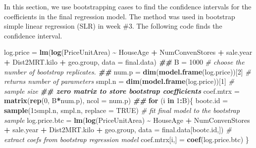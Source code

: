 \documentclass[
]{book}
\newenvironment{Shaded}{\begin{snugshade}}{\end{snugshade}}
\newcommand{\AttributeTok}[1]{\textcolor[rgb]{0.13,0.29,0.53}{#1}}
\newcommand{\CommentTok}[1]{\textcolor[rgb]{0.56,0.35,0.01}{\textit{#1}}}
\newcommand{\ConstantTok}[1]{\textcolor[rgb]{0.56,0.35,0.01}{#1}}
\newcommand{\ControlFlowTok}[1]{\textcolor[rgb]{0.13,0.29,0.53}{\textbf{#1}}}
\newcommand{\DecValTok}[1]{\textcolor[rgb]{0.00,0.00,0.81}{#1}}
\newcommand{\DocumentationTok}[1]{\textcolor[rgb]{0.56,0.35,0.01}{\textbf{\textit{#1}}}}
\newcommand{\FunctionTok}[1]{\textcolor[rgb]{0.13,0.29,0.53}{\textbf{#1}}}
\newcommand{\NormalTok}[1]{#1}
\newcommand{\OtherTok}[1]{\textcolor[rgb]{0.56,0.35,0.01}{#1}}
\newcommand{\SpecialCharTok}[1]{\textcolor[rgb]{0.81,0.36,0.00}{\textbf{#1}}}
\begin{document}
In this section, we use bootstrapping cases to find the confidence intervals for the coefficients in the final regression model. The method was used in bootstrap simple linear regression (SLR) in week \#3. The following code finds the confidence interval.

\begin{Shaded}
\begin{Highlighting}[]
\NormalTok{log.price }\OtherTok{=} \FunctionTok{lm}\NormalTok{(}\FunctionTok{log}\NormalTok{(PriceUnitArea) }\SpecialCharTok{\textasciitilde{}}\NormalTok{ HouseAge }\SpecialCharTok{+}\NormalTok{ NumConvenStores }\SpecialCharTok{+}\NormalTok{ sale.year }\SpecialCharTok{+}  
\NormalTok{                 Dist2MRT.kilo  }\SpecialCharTok{+}\NormalTok{ geo.group, }\AttributeTok{data =}\NormalTok{ final.data)}
\DocumentationTok{\#\#}
\NormalTok{B }\OtherTok{=} \DecValTok{1000}    \CommentTok{\# choose the number of bootstrap replicates.}
\DocumentationTok{\#\# }
\NormalTok{num.p }\OtherTok{=} \FunctionTok{dim}\NormalTok{(}\FunctionTok{model.frame}\NormalTok{(log.price))[}\DecValTok{2}\NormalTok{]  }\CommentTok{\# returns number of parameters }
\NormalTok{smpl.n }\OtherTok{=} \FunctionTok{dim}\NormalTok{(}\FunctionTok{model.frame}\NormalTok{(log.price))[}\DecValTok{1}\NormalTok{] }\CommentTok{\# sample size}
\DocumentationTok{\#\# zero matrix to store bootstrap coefficients }
\NormalTok{coef.mtrx }\OtherTok{=} \FunctionTok{matrix}\NormalTok{(}\FunctionTok{rep}\NormalTok{(}\DecValTok{0}\NormalTok{, B}\SpecialCharTok{*}\NormalTok{num.p), }\AttributeTok{ncol =}\NormalTok{ num.p)       }
\DocumentationTok{\#\# }
\ControlFlowTok{for}\NormalTok{ (i }\ControlFlowTok{in} \DecValTok{1}\SpecialCharTok{:}\NormalTok{B)\{}
\NormalTok{  bootc.id }\OtherTok{=} \FunctionTok{sample}\NormalTok{(}\DecValTok{1}\SpecialCharTok{:}\NormalTok{smpl.n, smpl.n, }\AttributeTok{replace =} \ConstantTok{TRUE}\NormalTok{) }
  \CommentTok{\# fit final model to the bootstrap sample}
\NormalTok{  log.price.btc }\OtherTok{=} \FunctionTok{lm}\NormalTok{(}\FunctionTok{log}\NormalTok{(PriceUnitArea) }\SpecialCharTok{\textasciitilde{}}\NormalTok{ HouseAge }\SpecialCharTok{+}\NormalTok{ NumConvenStores }\SpecialCharTok{+}\NormalTok{ sale.year }\SpecialCharTok{+}  
\NormalTok{                       Dist2MRT.kilo  }\SpecialCharTok{+}\NormalTok{ geo.group, }\AttributeTok{data =}\NormalTok{ final.data[bootc.id,])  }
  \CommentTok{\# extract coefs from bootstrap regression model  }
\NormalTok{  coef.mtrx[i,] }\OtherTok{=} \FunctionTok{coef}\NormalTok{(log.price.btc)      }
\NormalTok{\}}
\end{Highlighting}
\end{Shaded}
\end{document}

